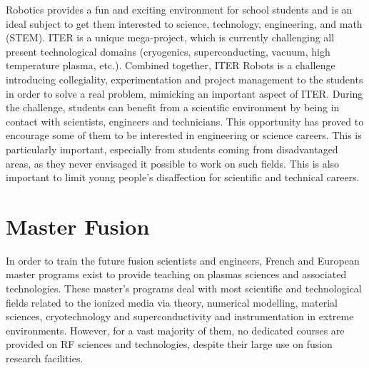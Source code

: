 
Robotics provides a fun and exciting environment for school students and is an ideal subject to get them interested to science, technology, engineering, and math (STEM). ITER is a unique mega-project, which is currently challenging all present technological domains (cryogenics, superconducting, vacuum, high temperature plasma, etc.). Combined together, ITER Robots is a challenge introducing collegiality, experimentation and project management to the students in order to solve a real problem, mimicking an important aspect of ITER. During the challenge, students can benefit from a scientific environment by being in contact with scientists, engineers and technicians. This opportunity has proved to encourage some of them to be interested in engineering or science careers. This is particularly important, especially from students coming from disadvantaged areas, as they never envisaged it possible to work on such fields. This is also important to limit young people's disaffection for scientific and technical careers. 


\section{Master Fusion}

In order to train the future fusion scientists and engineers, French and European master programs exist to provide teaching on plasmas sciences and associated technologies. These master's programs deal with most scientific and technological fields related to the ionized media via theory, numerical modelling, material sciences, cryotechnology and superconductivity and instrumentation in extreme environments. However, for a vast majority of them, no dedicated courses are provided on RF sciences and technologies, despite their large use on fusion research facilities. 

